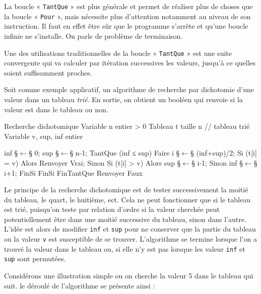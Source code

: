 La boucle « \texttt{TantQue} » est plus générale et permet de réaliser plus de choses que la boucle « \texttt{Pour} », mais nécessite plus d'attention notamment au niveau de son instruction. Il faut en effet être sûr que le programme s'arrête et qu'une boucle infinie ne s'installe. On parle de problème de terminaison.

Une des utilisations traditionnelles de la boucle « \texttt{TantQue} » est une suite convergente qui va calculer par itération successives les valeurs, jusqu'à ce quelles soient suffisamment proches.

Soit comme exemple applicatif, un algorithme de recherche par dichotomie d'une valeur dans un tableau \emph{trié}. En sortie, on obtient un booléen qui renvoie si la valeur est dans le tableau ou non.
\begin{algorithm}{Recherche dichotomique}
Variable n entier > 0
Tableau  t taille n // tableau trié
Variable v, sup, inf entier

inf §$\leftarrow$§ 0;
sup §$\leftarrow$§ n-1;
TantQue (inf ≤ sup) Faire
  i §$\leftarrow$§ (inf+sup)/2;
  Si (t[i] = v) Alors 
    Renvoyer Vrai;
  Sinon
    Si (t[i] > v) Alors 
      sup §$\leftarrow$§ i-1;
    Sinon 
      inf §$\leftarrow$§ i+1;
    FinSi
  FinSi
FinTantQue
Renvoyer Faux
\end{algorithm}

Le principe de la recherche dichotomique est de tester successivement la moitié du tableau, le quart, le huitième, ect. Cela ne peut fonctionner que si le tableau est trié, puisqu'on teste par relation d'ordre si la valeur cherchée peut potentiellement être dans une moitié successive du tableau, sinon dans l'autre. L'idée est alors de modifier \texttt{inf} et \texttt{sup} pour ne conserver que la partie du tableau ou la valeur \texttt{v} est susceptible de se trouver. L’algorithme se termine lorsque l'on a trouvé la valeur dans le tableau ou, si elle n'y est pas lorsque les valeur \texttt{inf} et \texttt{sup} sont permutées.

Considérons une illustration simple ou on cherche la valeur 5 dans le tableau qui suit. le déroulé de l'algorithme se présente ainsi :

